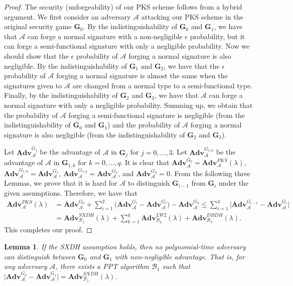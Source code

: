 \documentclass[11pt,letterpaper]{article}
\newtheorem{lemma}[theorem]{Lemma}
\newcommand{\Adv}{\textbf{Adv}}
\newcommand{\mc}[1]{\mathcal{#1}}
\newcommand{\tb}[1]{\textbf{#1}}
\begin{document}
\begin{proof}
The security (unforgeability) of our PKS scheme follows from a hybrid
argument. We first consider an adversary $\mc{A}$ attacking our PKS scheme in
the original security game $\tb{G}_0$. By the indistinguishability of
$\tb{G}_0$ and $\tb{G}_1$, we have that $\mc{A}$ can forge a normal signature
with a non-negligible $\epsilon$ probability, but it can forge a
semi-functional signature with only a negligible probability. Now we should
show that the $\epsilon$ probability of $\mc{A}$ forging a normal signature
is also negligible. By the indistinguishability of $\tb{G}_1$ and $\tb{G}_2$,
we have that the $\epsilon$ probability of $\mc{A}$ forging a normal
signature is almost the same when the signatures given to $\mc{A}$ are
changed from a normal type to a semi-functional type. Finally, by the
indistinguishability of $\tb{G}_2$ and $\tb{G}_3$, we have that $\mc{A}$ can
forge a normal signature with only a negligible probability. Summing up, we
obtain that the probability of $\mc{A}$ forging a semi-functional signature
is negligible (from the indistinguishability of $\tb{G}_0$ and $\tb{G}_1$)
and the probability of $\mc{A}$ forging a normal signature is also negligible
(from the indistinguishability of $\tb{G}_2$ and $\tb{G}_3$).

Let $\Adv_{\mc{A}}^{G_j}$ be the advantage of $\mc{A}$ in $\tb{G}_j$ for
$j=0, \ldots, 3$. Let $\Adv_{\mc{A}}^{G_{1,k}}$ be the advantage of $\mc{A}$
in $\tb{G}_{1,k}$ for $k=0, \ldots, q$. It is clear that
    $\Adv_{\mc{A}}^{G_0} = \Adv_{\mc{A}}^{PKS}(\lambda)$,
    $\Adv_{\mc{A}}^{G_{1,0}} = \Adv_{\mc{A}}^{G_1}$,
    $\Adv_{\mc{A}}^{G_{1,q}} = \Adv_{\mc{A}}^{G_2}$, and
    $\Adv_{\mc{A}}^{G_3} = 0$.
From the following three Lemmas, we prove that it is hard for $\mc{A}$ to
distinguish $\tb{G}_{i-1}$ from $\tb{G}_{i}$ under the given assumptions.
Therefore, we have that
    \begin{align*}
    \Adv_{\mc{A}}^{PKS}(\lambda)
    & = \Adv_{\mc{A}}^{G_0} +
        \sum_{i=1}^2 \big( \Adv_{\mc{A}}^{G_i} - \Adv_{\mc{A}}^{G_i} \big)
        - \Adv_{\mc{A}}^{G_3}
    \leq \sum_{i=1}^3 \big| \Adv_{\mc{A}}^{G_{i-1}} - \Adv_{\mc{A}}^{G_i} \big| \\
    & = \Adv_{\mc{B}_1}^{SXDH}(\lambda) +
        \sum_{k=1}^q \Adv_{\mc{B}_2}^{LW2}(\lambda) +
        \Adv_{\mc{B}_3}^{DBDH}(\lambda).
    \end{align*}
This completes our proof.
\end{proof}

\begin{lemma} \label{lem:pks1-prime-1}
If the SXDH assumption holds, then no polynomial-time adversary can
distinguish between $\tb{G}_0$ and $\tb{G}_1$ with non-negligible advantage.
That is, for any adversary $\mc{A}$, there exists a PPT algorithm $\mc{B}_1$
such that
    $\big| \Adv_{\mc{A}}^{G_0} - \Adv_{\mc{A}}^{G_1} \big|
    = \Adv_{\mc{B}_1}^{SXDH}(\lambda)$.
\end{lemma}
\end{document}

